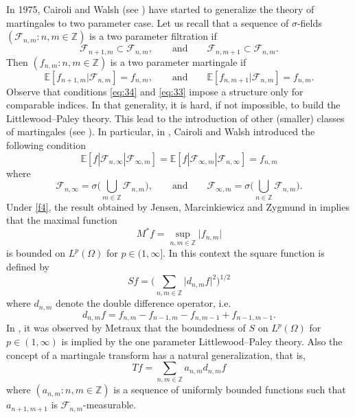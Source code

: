 \documentclass[a4paper]{amsart}
\newcommand{\abs}[1]{{\lvert {#1} \rvert}}
\newcommand{\EE}{\mathbb{E}}
\newcommand{\ZZ}{\mathbb{Z}}
\newcommand{\calF}{\mathcal{F}}
\theoremstyle{plain}
\theoremstyle{definition}
\theoremstyle{remark}
\numberwithin{equation}{section}
\theoremstyle{plain}
\begin{document}
In 1975, Cairoli and Walsh (see \cite{carwal}) have started to generalize the theory of martingales to two parameter case.
Let us recall that a sequence of $\sigma$-fields $(\calF_{n, m} : n, m \in \ZZ)$ is a two parameter filtration if
\begin{equation}
	\label{eq:34}
	\calF_{n+1, m} \subset \calF_{n, m}, \qquad \text{and} \qquad
	\calF_{n, m+1} \subset \calF_{n, m}.
\end{equation}
Then $(f_{n, m} : n, m \in \ZZ)$ is a two parameter martingale if
\begin{equation}
	\label{eq:33}
	\EE[f_{n+1, m} | \calF_{n, m}] = f_{n, m}, \qquad \text{and} \qquad
	\EE[f_{n, m+1} | \calF_{n, m}] = f_{n, m}.
\end{equation}
Observe that conditions \eqref{eq:34} and \eqref{eq:33} impose a structure only for comparable indices. 
In that generality, it is hard, if not impossible, to build the Littlewood--Paley theory. This lead to the introduction
of other (smaller) classes of martingales (see \cite{zak, wongzak}). In particular, in \cite{carwal}, Cairoli and Walsh
introduced the following condition
\begin{equation}
	\label{f4}
	\tag{$F_4$}
	\EE[f | \calF_{n, \infty} | \calF_{\infty, m} ] = 
	\EE[f | \calF_{\infty,m} | \calF_{n, \infty} ] = f_{n, m}
\end{equation}
where
\[
	\calF_{n, \infty} = \sigma\Big(\bigcup_{m \in \ZZ} \calF_{n ,m} \Big),
	\qquad \text{and} \qquad
	\calF_{\infty, m} = \sigma\Big(\bigcup_{n \in \ZZ} \calF_{n, m} \Big).
\]
Under \eqref{f4}, the result obtained by Jensen, Marcinkiewicz and Zygmund in \cite{jmz} implies that
the maximal function
\begin{equation}
	\label{eq:35}
	M^* f = \sup_{n, m \in \ZZ} \abs{f_{n, m}}
\end{equation}
is bounded on $L^p(\Omega)$ for $p \in (1, \infty]$. In this context the square function is defined by
\begin{equation}
	\label{eq:36}
	S f = \Big(\sum_{n, m \in \ZZ} \abs{d_{n, m} f}^2 \Big)^{1/2}
\end{equation}
where $d_{n, m}$ denote the double difference operator, i.e.
\[
	d_{n, m} f = f_{n, m} - f_{n-1, m} - f_{n, m-1} + f_{n-1, m-1}.
\]
In \cite{mat}, it was observed by Metraux that the boundedness of $S$ on $L^p(\Omega)$ for $p \in (1, \infty)$
is implied by the one parameter Littlewood--Paley theory. Also the concept of a martingale transform has a
natural generalization, that is,
\[
	T f = \sum_{n, m \in \ZZ} a_{n, m} d_{n, m} f
\]
where $(a_{n, m} : n,m \in \ZZ)$ is a sequence of uniformly bounded functions such that $a_{n+1, m+1}$ is 
$\calF_{n, m}$-measurable.
\end{document}
